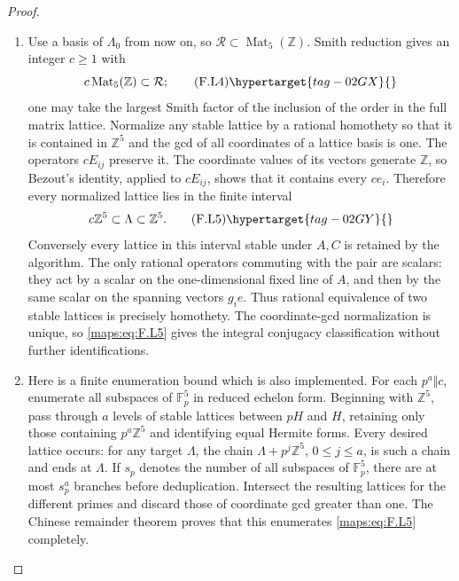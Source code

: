 \begin{proof}
\begin{enumerate}[label={$\langle1\rangle$\arabic*.}]
\item Use a basis of $\Lambda_0$ from now on, so
$\mathcal R\subset\operatorname{Mat}_5(\mathbb Z)$.
Smith reduction gives an integer $c\ge1$ with
\[
 c\operatorname{Mat}_5(\mathbb Z)\subset\mathcal R;
 \tag{F.L4}\hypertarget{tag-02GX}{}\label{maps:eq:F.L4}
\]
one may take the largest Smith factor of the inclusion
of the order in the full matrix lattice.
Normalize any stable lattice by a rational homothety so
that it is contained in $\mathbb Z^5$ and the gcd of all
coordinates of a lattice basis is one.
The operators $cE_{ij}$ preserve it.  The coordinate values
of its vectors generate $\mathbb Z$, so Bezout's identity,
applied to $cE_{ij}$, shows that it contains every $ce_i$.
Therefore every normalized lattice lies in the finite interval
\[
 c\mathbb Z^5\subset\Lambda\subset\mathbb Z^5.
 \tag{F.L5}\hypertarget{tag-02GY}{}\label{maps:eq:F.L5}
\]
Conversely every lattice in this interval stable under
$A,C$ is retained by the algorithm.
The only rational operators commuting with the pair are
scalars: they act by a scalar on the one-dimensional fixed
line of $A$, and then by the same scalar on the spanning
vectors $g_ie$.  Thus rational equivalence of two stable
lattices is precisely homothety.  The coordinate-gcd
normalization is unique, so \eqref{maps:eq:F.L5} gives the integral
conjugacy classification without further identifications.

\item Here is a finite enumeration bound which is also implemented.
For each $p^a\Vert c$, enumerate all subspaces of
$\mathbb F_p^5$ in reduced echelon form.
Beginning with $\mathbb Z^5$, pass through $a$ levels of
stable lattices between $pH$ and $H$, retaining only those
containing $p^a\mathbb Z^5$ and identifying equal Hermite
forms.  Every desired lattice occurs: for any target
$\Lambda$, the chain
$\Lambda+p^j\mathbb Z^5$, $0\le j\le a$, is such a
chain and ends at $\Lambda$.
If $s_p$ denotes the number of all subspaces of
$\mathbb F_p^5$, there are at most $s_p^a$ branches before
deduplication.  Intersect the resulting lattices for the
different primes and discard those of coordinate gcd
greater than one.  The Chinese remainder theorem proves
that this enumerates \eqref{maps:eq:F.L5} completely.


\end{enumerate}
\end{proof}
